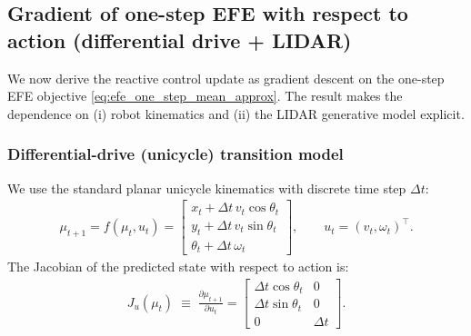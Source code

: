 \documentclass[a4paper, twoside]{article}
\begin{document}
\subsection{Gradient of one-step EFE with respect to action (differential drive + LIDAR)}
\label{sec:54_gradient}

We now derive the reactive control update as gradient descent on the one-step EFE objective \eqref{eq:efe_one_step_mean_approx}. The result makes the dependence on (i) robot kinematics and (ii) the LIDAR generative model explicit.

\subsubsection{Differential-drive (unicycle) transition model}
We use the standard planar unicycle kinematics with discrete time step $\Delta t$:
\begin{align}
\mu_{t+1} = f(\mu_t,u_t)
=
\begin{bmatrix}
x_t + \Delta t\, v_t\cos\theta_t\\
y_t + \Delta t\, v_t\sin\theta_t\\
\theta_t + \Delta t\, \omega_t
\end{bmatrix},
\qquad
u_t=(v_t,\omega_t)^\top.
\label{eq:unicycle_dynamics}
\end{align}
The Jacobian of the predicted state with respect to action is:
\begin{align}
J_u(\mu_t)
\;\equiv\;
\frac{\partial \mu_{t+1}}{\partial u_t}
=
\begin{bmatrix}
\Delta t\cos\theta_t & 0\\
\Delta t\sin\theta_t & 0\\
0 & \Delta t
\end{bmatrix}.
\label{eq:Ju}
\end{align}
\end{document}
